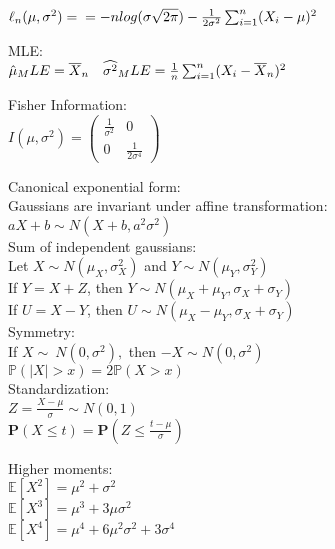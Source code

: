 $\ell_n (\mu,\sigma^2)= \\
= -n log(\sigma\sqrt{2\pi})-\frac{1}{2\sigma^2}\sum_{i=1}^n (X_i-\mu)^2 $

MLE:\\

$\hat\mu_MLE = \bar X_ n\\
\quad \widehat{\sigma ^2}_MLE = \frac{1}{n} \sum _{i=1}^{n} (X_ i - \bar X_ n)^2$

Fisher Information:\\

$I(\mu , \sigma ^2) = \begin{pmatrix}  \frac{1}{\sigma ^2} &  0 \\ 0 &  \frac{1}{2 \sigma ^4} \end{pmatrix}$

Canonical exponential form:\\

Gaussians are invariant under affine transformation:\\

$aX+b \sim N(X+b,a^2\sigma^2)$\\

Sum of independent gaussians:\\

Let $X {\sim} N(\mu_X,\sigma_X^2)$ and $Y {\sim} N(\mu_Y,\sigma_Y^2)$\\

If $Y = X + Z$, then $Y \sim N(\mu_X + \mu_Y, \sigma_X + \sigma_Y)$\\

If $U = X - Y$, then $U \sim N(\mu_X - \mu_Y,\sigma_X + \sigma_Y)$\\

Symmetry:\\

If $X \sim\ N(0,\sigma^2),$ then $-X \sim N(0,\sigma^2)$\\

$\mathbb{P}(|X|>x) = 2\mathbb{P}(X>x)$\\

Standardization:\\

$Z= \frac{X-\mu}{\sigma} \sim N(0,1)$\\

$\mathbf{P}\left(X\leq t\right) = \displaystyle \mathbf{P}\left(Z\leq \frac{t-\mu}{\sigma}\right)$

Higher moments:\\

$\mathbb{E}[X^2] = \mu^2 + \sigma^2$\\
$\mathbb{E}[X^3] = \mu^3 + 3\mu\sigma^2$\\
$\mathbb{E}[X^4] = \mu^4 + 6\mu^2\sigma^2 +3\sigma^4$\\

